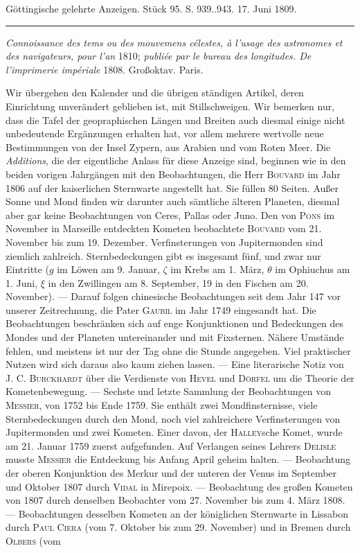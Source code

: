 \clearpage
{}
\hypertarget{native-522-lower}{}\label{native-522-lower}
\begin{center}\small Göttingische gelehrte Anzeigen. Stück 95. S. 939..943. 17. Juni 1809.\\[3pt]\rule{.72\linewidth}{.3pt}\end{center}

\emph{Connoissance des tems ou des mouvemens célestes, à l'usage des astronomes et des navigateurs, pour l'an} 1810; \emph{publiée par le bureau des longitudes. De l'imprimerie impériale} 1808. Großoktav. Paris.

Wir übergehen den Kalender und die übrigen ständigen Artikel, deren Einrichtung unverändert geblieben ist, mit Stillschweigen. Wir bemerken nur, dass die Tafel der geopraphischen Längen und Breiten auch diesmal einige nicht unbedeutende Ergänzungen erhalten hat, vor allem mehrere wertvolle neue Bestimmungen von der Insel Zypern, aus Arabien und vom Roten Meer. Die \emph{Additions}, die der eigentliche Anlass für diese Anzeige sind, beginnen wie in den beiden vorigen Jahrgängen mit den Beobachtungen, die Herr \textsc{Bouvard} im Jahr 1806 auf der kaiserlichen Sternwarte angestellt hat. Sie füllen 80 Seiten. Außer Sonne und Mond finden wir darunter auch sämtliche älteren Planeten, diesmal aber gar keine Beobachtungen von Ceres, Pallas oder Juno. Den von \textsc{Pons} im November in Marseille entdeckten Kometen beobachtete \textsc{Bouvard} vom 21. November bis zum 19. Dezember. Verfinsterungen von Jupitermonden sind ziemlich zahlreich. Sternbedeckungen gibt es insgesamt fünf, und zwar nur Eintritte ($g$ im Löwen am 9. Januar, $\zeta$ im Krebs am 1. März, $\theta$ im Ophiuchus am 1. Juni, $\xi$ in den Zwillingen am 8. September, 19 in den Fischen am 20. November). — Darauf folgen chinesische Beobachtungen seit dem Jahr 147 vor unserer Zeitrechnung, die Pater \textsc{Gaubil} im Jahr 1749 eingesandt hat. Die Beobachtungen beschränken sich auf enge Konjunktionen und Bedeckungen des Mondes und der Planeten untereinander und mit Fixsternen. Nähere Umstände fehlen, und meistens ist nur der Tag ohne die Stunde angegeben. Viel praktischer Nutzen wird sich daraus also kaum ziehen lassen. — Eine literarische Notiz von \textsc{J. C. Burckhardt} über die Verdienste von \textsc{Hevel} und \textsc{Dörfel} um die Theorie der Kometenbewegung. — Sechste und letzte Sammlung der Beobachtungen von \textsc{Messier}, von 1752 bis Ende 1759. Sie enthält zwei Mondfinsternisse, viele Sternbedeckungen durch den Mond, noch viel zahlreichere Verfinsterungen von Jupitermonden und zwei Kometen. Einer davon, der \textsc{Halley}sche Komet, wurde am 21. Januar 1759 zuerst aufgefunden. Auf Verlangen seines Lehrers \textsc{Delisle} musste \textsc{Messier} die Entdeckung bis Anfang April geheim halten. — Beobachtung der oberen Konjunktion des Merkur und der unteren der Venus im September und Oktober 1807 durch \textsc{Vidal} in Mirepoix. — Beobachtung des großen Kometen von 1807 durch denselben Beobachter vom 27. November bis zum 4. März 1808. — Beobachtungen desselben Kometen an der königlichen Sternwarte in Lissabon durch \textsc{Paul Ciera} (vom 7. Oktober bis zum 29. November) und in Bremen durch \textsc{Olbers} (vom 